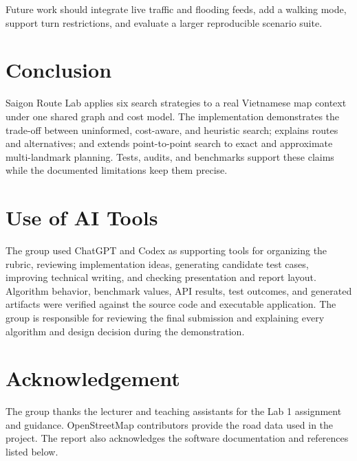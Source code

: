 \documentclass[12pt,a4paper]{article}
\begin{document}
Future work should integrate live traffic and flooding feeds, add a walking
mode, support turn restrictions, and evaluate a larger reproducible scenario
suite.

\section{Conclusion}

Saigon Route Lab applies six search strategies to a real Vietnamese map context
under one shared graph and cost model. The implementation demonstrates the
trade-off between uninformed, cost-aware, and heuristic search; explains routes
and alternatives; and extends point-to-point search to exact and approximate
multi-landmark planning. Tests, audits, and benchmarks support these claims
while the documented limitations keep them precise.

\section{Use of AI Tools}

The group used ChatGPT and Codex as supporting tools for organizing the rubric,
reviewing implementation ideas, generating candidate test cases, improving
technical writing, and checking presentation and report layout. Algorithm
behavior, benchmark values, API results, test outcomes, and generated artifacts
were verified against the source code and executable application. The group is
responsible for reviewing the final submission and explaining every algorithm
and design decision during the demonstration.

\section{Acknowledgement}

The group thanks the lecturer and teaching assistants for the Lab 1 assignment
and guidance. OpenStreetMap contributors provide the road data used in the
project. The report also acknowledges the software documentation and references
listed below.
\end{document}
